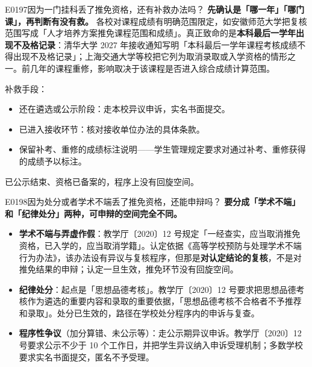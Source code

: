 \begin{qa}{E0197}{因为一门挂科丢了推免资格，还有补救办法吗？}
\textbf{先确认是「哪一年」「哪门课」，再判断有没有救。}
各校对课程成绩有明确范围限定，如安徽师范大学把复核范围写成「人才培养方案推免课程范围和成绩」。真正致命的是\textbf{本科最后一学年出现不及格记录}：清华大学 2027 年接收通知写明「本科最后一学年课程考核成绩不得出现不及格记录」；上海交通大学等校把它列为取消录取或入学资格的情形之一。前几年的课程重修，影响取决于该课程是否进入综合成绩计算范围。

补救手段：
\begin{itemize}
  \item 还在遴选或公示阶段：走本校异议申诉，实名书面提交。
  \item 已进入接收环节：核对接收单位办法的具体条款。
  \item 保留补考、重修的成绩标注说明——学生管理规定要求对通过补考、重修获得的成绩予以标注。
\end{itemize}

已公示结束、资格已备案的，程序上没有回旋空间。
\end{qa}

\begin{qa}{E0198}{因为处分或者学术不端丢了推免资格，还能申辩吗？}
\textbf{要分成「学术不端」和「纪律处分」两种，可申辩的空间完全不同。}
\begin{itemize}
  \item \textbf{学术不端与弄虚作假}：教学厅〔2020〕12 号规定「一经查实，应当取消推免资格，已入学的，应当取消学籍」。认定依据《高等学校预防与处理学术不端行为办法》，该办法设有异议与复核程序，但那是\textbf{对认定结论的复核}，不是对推免结果的申辩；认定一旦生效，推免环节没有回旋空间。
  \item \textbf{纪律处分}：起点是「思想品德考核」。教学厅〔2020〕12 号要求把思想品德考核作为遴选的重要内容和录取的重要依据，「思想品德考核不合格者不予推荐和录取」。处分已生效的，路径在学校处分程序内的申诉与复查。
  \item \textbf{程序性争议}（加分算错、未公示等）：走公示期异议申诉。教学厅〔2020〕12 号要求公示不少于 10 个工作日，并把学生异议纳入申诉受理机制；多数学校要求实名书面提交，匿名不予受理。
\end{itemize}
\end{qa}

